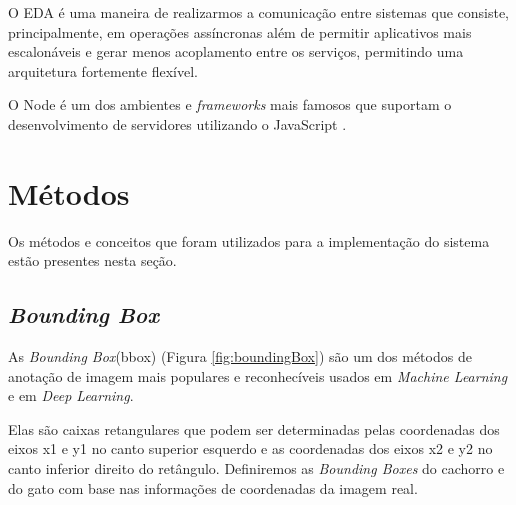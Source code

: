 O EDA é uma maneira de realizarmos a comunicação entre sistemas que consiste, principalmente, em operações assíncronas além de permitir aplicativos mais escalonáveis e gerar menos acoplamento entre os serviços, permitindo uma arquitetura fortemente flexível. 

O Node é um dos ambientes e \textit{frameworks} mais famosos que suportam o desenvolvimento de servidores utilizando o JavaScript \cite{Tilkov2010}.



\section{Métodos}
Os métodos e conceitos que foram utilizados para a implementação do sistema estão presentes nesta seção.

\subsection{\textit{Bounding Box}}

As \textit{Bounding Box}(bbox) (Figura \ref{fig:boundingBox}) são um dos métodos de anotação de imagem mais populares e reconhecíveis usados em \textit{Machine Learning} e em \textit{Deep Learning}.

Elas são caixas retangulares que podem ser determinadas pelas coordenadas dos eixos x1 e y1 no canto superior esquerdo e as coordenadas dos eixos x2 e y2 no canto inferior direito do retângulo. Definiremos as \textit{Bounding Boxes} do cachorro e do gato com base nas informações de coordenadas da imagem real.\cite{allDeep}

